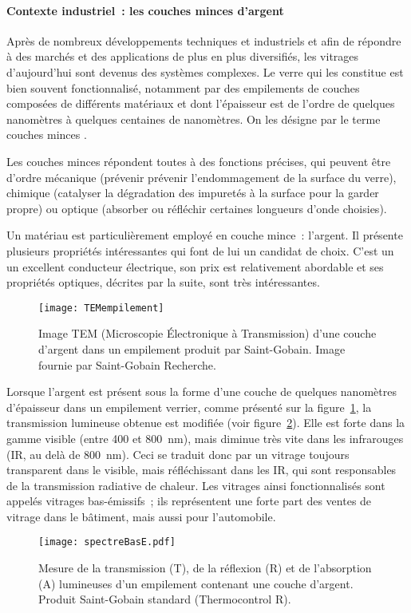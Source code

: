 \newpage\null\thispagestyle{empty}\newpage
\paragraph*{Contexte industriel~: les couches minces d'argent\newline}

Après de nombreux développements techniques et industriels et afin de répondre à des marchés et des applications de plus en plus diversifiés, les vitrages d'aujourd'hui sont devenus des systèmes complexes. Le verre qui les constitue est bien souvent fonctionnalisé, notamment par des empilements de couches composées de différents matériaux et dont l'épaisseur est de l'ordre de quelques nanomètres à quelques centaines de nanomètres. On les désigne par le terme \og couches minces \fg.\par 
Les couches minces répondent toutes à des fonctions précises, qui peuvent être d'ordre mécanique (prévenir prévenir l'endommagement de la surface du verre), chimique (catalyser la dégradation des impuretés à la surface pour la garder propre) ou optique (absorber ou réfléchir certaines longueurs d'onde choisies).\par 
Un matériau est particulièrement employé en couche mince~: l'argent. Il présente plusieurs propriétés intéressantes qui font de lui un candidat de choix. C'est un un excellent conducteur électrique, son prix est relativement abordable et ses propriétés optiques, décrites par la suite, sont très intéressantes.\par 
\begin{figure}[!htb]
\centering
\texttt{[image: TEMempilement]}
\caption{Image TEM (Microscopie Électronique à Transmission) d'une couche d'argent dans un empilement produit par Saint-Gobain. Image fournie par Saint-Gobain Recherche.}
\label{TEMthinLayer}
\end{figure}
Lorsque l'argent est présent sous la forme d'une couche de quelques nanomètres d'épaisseur dans un empilement verrier, comme présenté sur la figure~\ref{TEMthinLayer}, la transmission lumineuse obtenue est modifiée (voir figure~\ref{transmissionStack}). Elle est forte dans la gamme visible (entre 400 et 800~nm), mais diminue très vite dans les infrarouges (IR, au delà de 800~nm). Ceci se traduit donc par un vitrage toujours transparent dans le visible, mais réfléchissant dans les IR, qui sont responsables de la transmission radiative de chaleur. Les vitrages ainsi fonctionnalisés sont appelés vitrages bas-émissifs~; ils représentent une forte part des ventes de vitrage dans le bâtiment, mais aussi pour l'automobile.\par 
\begin{figure}[!htb]
\centering
\texttt{[image: spectreBasE.pdf]}
\caption{Mesure de la transmission (T), de la réflexion (R) et de l'absorption (A) lumineuses d'un empilement contenant une couche d'argent. Produit Saint-Gobain standard (Thermocontrol R).}
\label{transmissionStack}
\end{figure}

